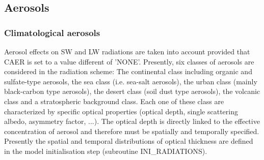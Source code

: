 \subsection{Aerosols}
\subsubsection{Climatological aerosols}

Aerosol effects on SW and LW radiations are taken into account provided that CAER is set to a value different of 'NONE'. Presently, six classes of aerosols are considered in the radiation scheme: The continental class including organic and sulfate-type aerosols, the sea class (i.e. sea-salt aerosols), the urban class (mainly  black-carbon type aerosols), the desert class (soil dust type aerosols), the volcanic class and a stratospheric background class. Each one of these class are characterized by specific optical properties (optical depth, single scattering albedo, asymmetry factor, ...). The optical depth is directly linked to the effective concentration of aerosol and therefore must be spatially and temporally specified. Presently the spatial and temporal distributions of optical thickness are defined in the model initialisation step (subroutine INI\_RADIATIONS).  

